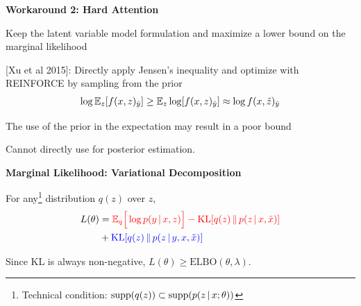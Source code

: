 \documentclass[aspectratio=169]{beamer}
\let\tempone\itemize
\let\temptwo\enditemize
\renewenvironment{itemize}{\tempone\addtolength{\itemsep}{0.5\baselineskip}}{\temptwo}
\newcommand{\thetitle}[1]{{\begin{center}\textbf{{#1}}\end{center}}}
\newcommand{\air}{\vspace{0.25cm}}
\begin{document}
\begin{frame}\thetitle{Workaround 2: Hard Attention}
\begin{itemize}
\item Keep the latent variable model formulation and maximize a lower bound
on the marginal likelihood
\air
\item {\small[Xu et al 2015]}: Directly apply Jensen's inequality and optimize
    with REINFORCE by sampling from the prior
    \begin{eqnarray*}
        \log \mathbb{E}_z [f(x, z)_{\hat{y}}] \ge \mathbb{E}_z \log [f(x, z)_{\hat{y}}] \approx \log f(x, \tilde{z})_{\hat{y}}
    \end{eqnarray*}
\item The use of the prior in the expectation may result in a poor bound
\item Cannot directly use for posterior estimation.

\end{itemize}
\end{frame}


\begin{frame}
\thetitle{Marginal Likelihood: Variational Decomposition}

For any\footnote{Technical condition: $\text{supp}(q(z)) \subset \text{supp}(p(z \,|\, x ; \theta))$} distribution $q(z)$ over $z$,
\begin{align*}
 L(\theta) &= \textcolor{red}{\mathbb{E}_{q}\Big[\log p(y \,|\, x, z) \Big] - \operatorname*{KL}[q(z) \, \Vert \, p(z
  \,|\, x, \tilde{x})] } \\ &
+ \textcolor{blue}{\operatorname*{KL}[q(z )  \, \Vert \, p(z \,|\, y, x, \tilde{x} )]}
\end{align*}

\begin{center}
\end{center}


Since KL is always non-negative, $L(\theta) \geq \text{ELBO}(\theta, \lambda)$.
\end{frame}
\end{document}
